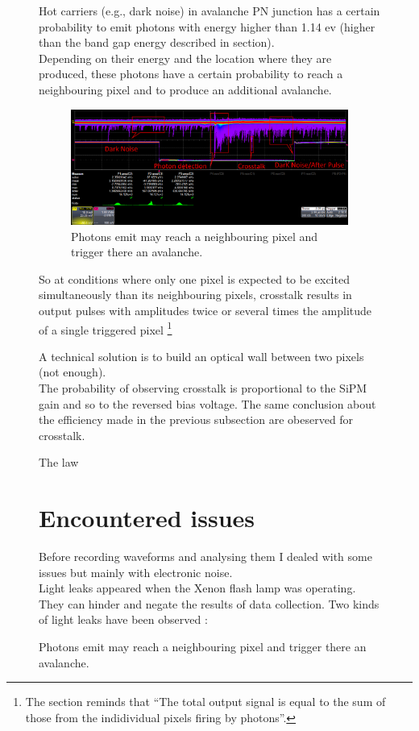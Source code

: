 \documentclass[a4paper, 11pt]{report}%
\newcommand{\xfl}{Xenon flash lamp }
\begin{document}
\begin{figure}[!hbtp]
  Hot carriers (e.g., dark noise) in avalanche PN junction has a certain probability to emit photons with energy higher than 1.14 ev (higher than 
  the band gap energy described in section).\\
  Depending on their energy and the location where they are produced, these photons have a certain probability to reach a 
  neighbouring pixel and to produce an additional avalanche. 
  
  \begin{figure}[!hbtp]
  \centering
  \includegraphics[totalheight=0.22\textwidth,trim=0cm 6.5cm 0cm 0cm, clip=true]{Pictures/blabla/DN_AP_CT_1.png}
  \caption{Photons emit may reach a neighbouring pixel and trigger there an avalanche.}
  \label{fig:CT}
  \end{figure}
  
  So at conditions where only one pixel is expected to be excited simultaneously than its neighbouring pixels, crosstalk results in output 
  pulses with amplitudes twice or several times the amplitude of a single triggered pixel
  \footnote{The section\label{Basic operation} reminds that ``The total output signal is equal to the sum of those from the indidividual 
  pixels firing by photons''.}
  
  A technical solution is to build an optical wall between two pixels (not enough). 
  \\
  
  The probability of observing crosstalk is proportional to the SiPM gain and so to the reversed bias voltage. The same conclusion about the 
  efficiency made in the previous subsection are obeserved for crosstalk. 
  
  The law
  
  
  \section{Encountered issues}  
  
  Before recording waveforms and analysing them I dealed with some issues but mainly with electronic noise.\\
  Light leaks appeared when the \xfl was operating. They can hinder and negate the results of data collection. 
  Two kinds of light leaks have been observed :
  

\end{figure}
\end{document}
